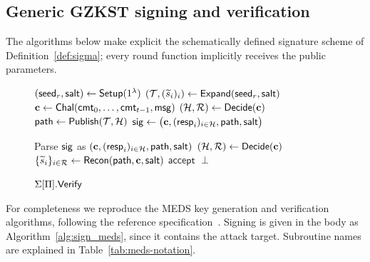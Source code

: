 \subsection{Generic GZKST signing and verification}
\label{app:generic-algs}
The algorithms below make explicit the schematically defined signature
scheme of Definition~\ref{def:sigma}; every round function implicitly
receives the public parameters.

\begin{figure}[htbp]
\centering
\begin{minipage}[t]{0.48\textwidth}
\begin{algorithm}[H]
\footnotesize
\setlength{\algomargin}{0.7em}
\caption{$\Sig[\Pi].\Sign$}
\label{alg:generic}
$(\mathsf{seed}_r,\mathsf{salt}) \leftarrow \mathsf{Setup}(1^{\lambda})$\;
$(\mathcal{T},(\widetilde{s}_i)_i) \leftarrow \mathsf{Expand}(\mathsf{seed}_r,\mathsf{salt})$\;
$\mathbf{c} \leftarrow \mathsf{Chal}(\mathsf{cmt}_0,\ldots,\mathsf{cmt}_{t-1},\mathsf{msg})$\;
$(\mathcal{H},\mathcal{R}) \leftarrow \mathsf{Decide}(\mathbf{c})$\;
$\mathsf{path} \leftarrow \mathsf{Publish}(\mathcal{T},\mathcal{H})$\;
\Return $\mathsf{sig} \leftarrow \bigl(\mathbf{c},(\mathsf{resp}_i)_{i\in\mathcal{H}},\mathsf{path},\mathsf{salt}\bigr)$
\end{algorithm}
\end{minipage}\hfill
\begin{minipage}[t]{0.48\textwidth}
\begin{algorithm}[H]
\footnotesize
\setlength{\algomargin}{0.7em}
\caption{$\Sigma[\Pi].\mathsf{Verify}$}
\label{alg:generic-verify}
Parse $\mathsf{sig}$ as $(\mathbf{c},(\mathsf{resp}_i)_{i\in\mathcal{H}},\mathsf{path},\mathsf{salt})$\;
$(\mathcal{H},\mathcal{R}) \leftarrow \mathsf{Decide}(\mathbf{c})$\;
$\{\widetilde{s}_i\}_{i \in \mathcal{R}} \leftarrow \mathsf{Recon}(\mathsf{path},\mathbf{c},\mathsf{salt})$\;
   {\Return $\mathsf{accept}$}
\Return $\perp$
\end{algorithm}
\end{minipage}
\end{figure}

For completeness we reproduce the MEDS key generation and verification
algorithms, following the reference specification~\cite{ChouNPRRST23,MEDS_PQC}.
Signing is given in the body as Algorithm~\ref{alg:sign_meds}, since it
contains the attack target. Subroutine names are explained in
Table~\ref{tab:meds-notation}.

